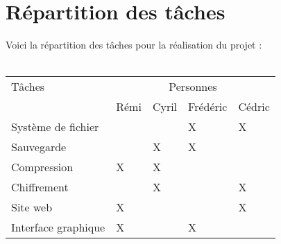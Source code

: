 \newpage

\section{Répartition des tâches}
    
    Voici la répartition des tâches pour la réalisation du projet : \\ \\

    {\normalsize
    	\begin{tabular}{|p{6cm}|p{1.6cm}|p{1.6cm}|p{1.6cm}|p{1.6cm}|}
    		\hline
    		Tâches & \multicolumn{4}{|c|}{Personnes} \\ 
    		\cline{2-5}
    			& Rémi & Cyril & Frédéric & Cédric \\
    		\hline
    		Système de fichier &  &  & X & X \\
    		\hline
    		Sauvegarde &  & X & X &  \\
    		\hline
    		Compression & X & X &  &  \\
    		\hline
    		Chiffrement &  & X &  & X \\
    		\hline
    		Site web & X &  &  & X \\
    		\hline
    		Interface graphique & X &  & X &  \\
    		\hline
    	\end{tabular}
    	\label{répartition}		
    }
